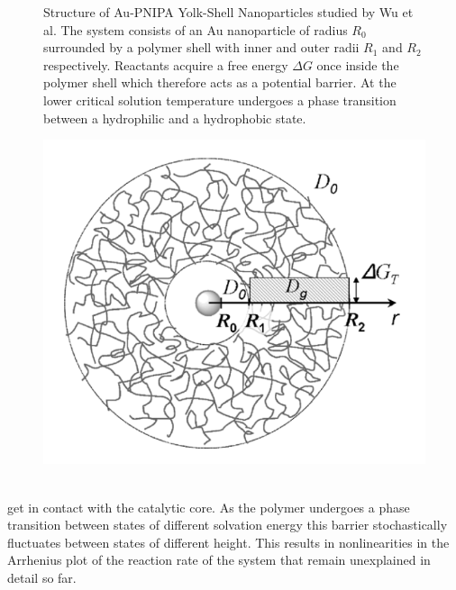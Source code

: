 \begin{minipage}[t]{0.62 \textwidth}
    \begin{figure}[H]
        \caption{Structure of Au-PNIPA Yolk-Shell Nanoparticles studied by Wu et al. The system consists of an Au nanoparticle of radius $R_0$ surrounded by a polymer shell with inner and outer radii $R_1$ and $R_2$ respectively. Reactants acquire a free energy $\Delta G$ once inside the polymer shell which therefore acts as a potential barrier. At the lower critical solution temperature undergoes a phase transition between a hydrophilic and a hydrophobic state.\label{PNIPA}}    
    \end{figure}
\end{minipage}\begin{minipage}[t]{0.38 \textwidth}
    \begin{figure}[H]
         \includegraphics[width = 1.1 \textwidth]{plots/PNIPA.png}
    \end{figure}
\end{minipage}
\vspace{0.3 cm} \\
get in contact with the catalytic core. 
As the polymer undergoes a phase transition between states of different solvation energy this barrier stochastically fluctuates between states of different height. This results in nonlinearities in the Arrhenius plot of the reaction rate of the system that remain unexplained in detail so far. \\

